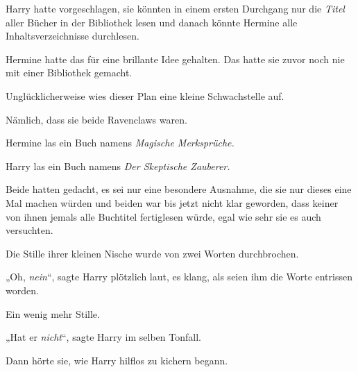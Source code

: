 Harry hatte vorgeschlagen, sie könnten in einem ersten Durchgang nur die \emph{Titel} aller Bücher in der Bibliothek lesen und danach könnte Hermine alle Inhaltsverzeichnisse durchlesen.

Hermine hatte das für eine brillante Idee gehalten. Das hatte sie zuvor noch nie mit einer Bibliothek gemacht.

Unglücklicherweise wies dieser Plan eine kleine Schwachstelle auf.

Nämlich, dass sie beide Ravenclaws waren.

Hermine las ein Buch namens \emph{Magische Merksprüche.}

Harry las ein Buch namens \emph{Der Skeptische Zauberer.}

Beide hatten gedacht, es sei nur eine besondere Ausnahme, die sie nur dieses eine Mal machen würden und beiden war bis jetzt nicht klar geworden, dass keiner von ihnen jemals alle Buchtitel fertiglesen würde, egal wie sehr sie es auch versuchten.

Die Stille ihrer kleinen Nische wurde von zwei Worten durchbrochen.

„Oh, \emph{nein}“, sagte Harry plötzlich laut, es klang, als seien ihm die Worte entrissen worden.

Ein wenig mehr Stille.

„Hat er \emph{nicht}“, sagte Harry im selben Tonfall.

Dann hörte sie, wie Harry hilflos zu kichern begann.

